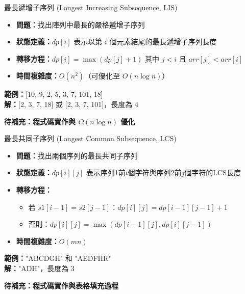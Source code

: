 \documentclass{beamer}
\begin{document}
\begin{frame}{最長遞增子序列 (Longest Increasing Subsequence, LIS)}
\begin{itemize}
    \item \textbf{問題：}找出陣列中最長的嚴格遞增子序列
    \item \textbf{狀態定義：}$dp[i]$ 表示以第 $i$ 個元素結尾的最長遞增子序列長度
    \item \textbf{轉移方程：}$dp[i] = \max(dp[j] + 1)$ 其中 $j < i$ 且 $arr[j] < arr[i]$
    \item \textbf{時間複雜度：}$O(n^2)$（可優化至 $O(n \log n)$）
\end{itemize}

\vspace{1em}
\textbf{範例：}[10, 9, 2, 5, 3, 7, 101, 18]\\
\textbf{解：}[2, 3, 7, 18] 或 [2, 3, 7, 101]，長度為 4

\vspace{1em}
\textbf{待補充：程式碼實作與 $O(n \log n)$ 優化}
\end{frame}

\begin{frame}{最長共同子序列 (Longest Common Subsequence, LCS)}
\begin{itemize}
    \item \textbf{問題：}找出兩個序列的最長共同子序列
    \item \textbf{狀態定義：}$dp[i][j]$ 表示序列1前$i$個字符與序列2前$j$個字符的LCS長度
    \item \textbf{轉移方程：}
    \begin{itemize}
        \item 若 $s1[i-1] = s2[j-1]$：$dp[i][j] = dp[i-1][j-1] + 1$
        \item 否則：$dp[i][j] = \max(dp[i-1][j], dp[i][j-1])$
    \end{itemize}
    \item \textbf{時間複雜度：}$O(mn)$
\end{itemize}

\vspace{1em}
\textbf{範例：}"ABCDGH" 和 "AEDFHR"\\
\textbf{解：}"ADH"，長度為 3

\vspace{1em}
\textbf{待補充：程式碼實作與表格填充過程}
\end{frame}
\end{document}
